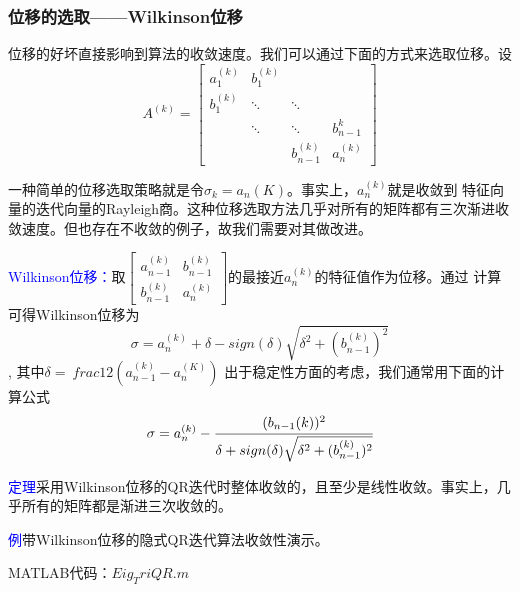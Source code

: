\documentclass[notheorems,serif]{beamer}
\begin{document}
\begin{frame}
\frametitle{位移的选取——Wilkinson位移}


位移的好坏直接影响到算法的收敛速度。我们可以通过下面的方式来选取位移。设
$$A^{(k)}=\begin{bmatrix}
a_1^{(k)}&b_1^{(k)}&&\\
b_1^{(k)}&\ddots &\ddots &\\
&\ddots &\ddots &b_{n-1}^{k}\\
&&b_{n-1}^{(k)}&a_n^{(k)}
\end{bmatrix}$$

一种简单的位移选取策略就是令$\sigma _k=a_n{(K)}$。事实上，$a_n^{(k)}$就是收敛到
特征向量的迭代向量的Rayleigh商。这种位移选取方法几乎对所有的矩阵都有三次渐进收敛速度。但也存在不收敛的例子，故我们需要对其做改进。
\end{frame}
\begin{frame}

\textcolor{blue}{Wilkinson位移：}取$\begin{bmatrix}a_{n-1}^{(k)}&b_{n-1}^{(k)}\\
b_{n-1}^{(k)}&a_n^{(k)} \end{bmatrix}$的最接近$a_n^{(k)}$的特征值作为位移。通过
计算可得Wilkinson位移为
$$\sigma =a_n^{(k)}+\delta -sign(\delta)\sqrt{\delta
	^2+(b_{n-1}^{(k)})^2}$$,
其中$\delta=\
frac{1}{2}(a_{n-1}^{(k)}-a_n^{(K)})$
出于稳定性方面的考虑，我们通常用下面的计算公式\begin{equation}
\sigma=a_n^{(k)}-\cfrac{(b_{n-1}{(k)})^2}{\delta +sign(\delta)\sqrt{\delta
		^2+(b_{n-1}^{(k)})^2}}
\end{equation}

\textcolor{blue}{定理}\quad 采用Wilkinson位移的QR迭代时整体收敛的，且至少是线性收敛。事实上，几乎所有的矩阵都是渐进三次收敛的。
\end{frame}
\begin{frame}
\textcolor{blue}{例}\quad 带Wilkinson位移的隐式QR迭代算法收敛性演示。

MATLAB代码：$Eig_TriQR.m$
\end{frame}
\end{document}
